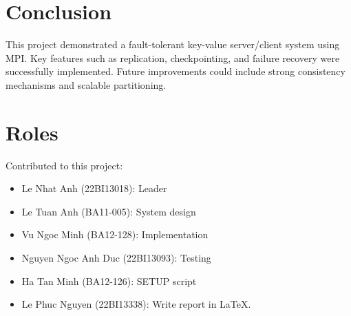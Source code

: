 \documentclass[12pt]{article}
\begin{document}
\section{Conclusion}
This project demonstrated a fault-tolerant key-value server/client system using MPI. Key features such as replication, checkpointing, and failure recovery were successfully implemented. Future improvements could include strong consistency mechanisms and scalable partitioning.

\section{Roles}
Contributed to this project:
\begin{itemize}
    \item Le Nhat Anh (22BI13018): Leader
    \item Le Tuan Anh (BA11-005): System design
    \item Vu Ngoc Minh (BA12-128): Implementation
    \item Nguyen Ngoc Anh Duc (22BI13093): Testing
    \item Ha Tan Minh (BA12-126): SETUP script
    \item Le Phuc Nguyen (22BI13338): Write report in LaTeX.
\end{itemize}
\end{document}
